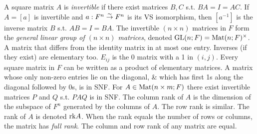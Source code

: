  A square matrix $A$ is \emph{invertible} if there exist matrices $B, C$ s.t. $BA = I = AC$. If $A = [a]$ is invertible and $a : F^{n} \stackrel{\sim}{\to} F^{n}$ is its VS isomorphism, then $[a^{-1}]$ is the inverse matrix $B$ s.t. $AB = I = BA$. The invertible $(n \times n)$ matrices in $F$ form the \emph{general linear group of $(n \times n)$ matrices}, denoted $\text{GL}(n; F) = \text{Mat}(n; F)^{\times}$.
 A matrix that differs from the identity matrix in at most one entry. Inverses (if they exist) are elementary too.
 $E_{ij}$ is the 0 matrix with a 1 in $(i, j)$. %
 Every square matrix in $F$ can be written as a product of elementary matrices.
 A matrix whose only non-zero entries lie on the diagonal, \& which has first 1s along the diagonal followed by 0s, is in SNF.
 For $A \in \text{Mat}(n \times m; F)$ there exist invertible matrices $P$ and $Q$ s.t. $PAQ$ is in SNF.
 The column rank of $A$ is the dimension of the subspace of $F^{n}$ generated by the columns of $A$. The row rank is similar. The rank of $A$ is denoted $\text{rk} A$. When the rank equals the number of rows or columns, the matrix has \emph{full rank}.
 The column and row rank of any matrix are equal.
